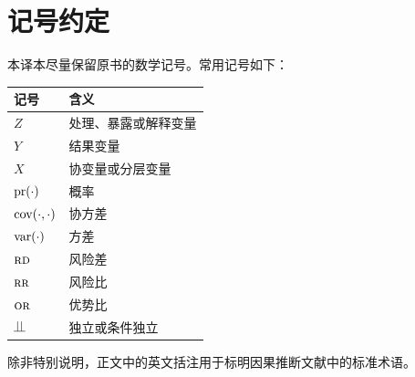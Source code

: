 \chapter*{记号约定}

本译本尽量保留原书的数学记号。常用记号如下：

\begin{center}
\begin{tabular}{ll}
\hline
记号 & 含义 \\
\hline
$Z$ & 处理、暴露或解释变量 \\
$Y$ & 结果变量 \\
$X$ & 协变量或分层变量 \\
$\textup{pr}(\cdot)$ & 概率 \\
$\textup{cov}(\cdot,\cdot)$ & 协方差 \\
$\textup{var}(\cdot)$ & 方差 \\
$\textsc{rd}$ & 风险差 \\
$\textsc{rr}$ & 风险比 \\
$\textsc{or}$ & 优势比 \\
$\ind$ & 独立或条件独立 \\
\hline
\end{tabular}
\end{center}

除非特别说明，正文中的英文括注用于标明因果推断文献中的标准术语。
